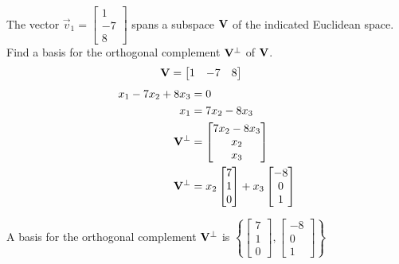 \documentclass{article}
\begin{document}
The vector $ \vec{v}_1 = \begin{bmatrix} 1 \\ -7 \\ 8 \end{bmatrix} $ spans a subspace $ \mathbf{V} $ of the indicated Euclidean space. Find a basis for the orthogonal complement $ \mathbf{V}^\perp $ of $ \mathbf{V} $.
\begin{align*}
	\mathbf{V} & = \begin{bmatrix} 1 & -7 & 8 \end{bmatrix}
\end{align*}
\begin{align*}
	x_1 - 7x_2 + 8x_3 & = 0 \\
	x_1 & = 7x_2 - 8x_3 \\
	\mathbf{V}^\perp & =
		\begin{bmatrix}
			7x_2 - 8x_3 \\
			x_2 \\
			x_3
		\end{bmatrix} \\
	\mathbf{V}^\perp & =
		x_2 \begin{bmatrix} 7 \\ 1 \\ 0 \end{bmatrix}
		+ x_3 \begin{bmatrix} -8 \\ 0 \\ 1 \end{bmatrix}
\end{align*}
\begin{mdframed}
	A basis for the orthogonal complement $ \mathbf{V}^\perp $ is
	$ \left\{
		\begin{bmatrix} 7 \\ 1 \\ 0 \end{bmatrix},
		\begin{bmatrix} -8 \\ 0 \\ 1 \end{bmatrix}
	\right\} $
\end{mdframed}
\end{document}
